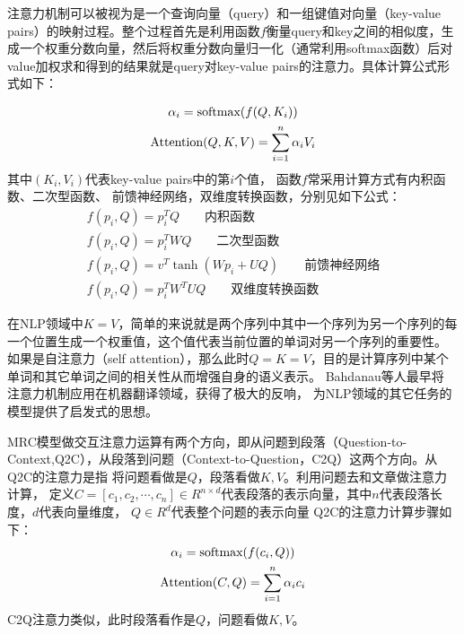 注意力机制可以被视为是一个查询向量（query）和一组键值对向量（key-value pairs）的映射过程。整个过程首先是利用函数$f$衡量query和key之间的相似度，生成一个权重分数向量，然后将权重分数向量归一化（通常利用softmax函数）后对value加权求和得到的结果就是query对key-value pairs的注意力。具体计算公式形式如下：

\begin{gather}
\alpha_i=\text{softmax}(f(Q,K_i)) \notag \\
\text{Attention}(Q,K,V)=\sum_{i=1}^{n}\alpha_iV_i
\end{gather}
其中$(K_i,V_i)$代表key-value pairs中的第$i$个值，
函数$f$常采用计算方式有内积函数、二次型函数、
前馈神经网络，双维度转换函数，分别见如下公式：
\begin{gather}
f(p_i,Q)=p_i^TQ \qquad \text{内积函数} \\
f(p_i,Q)=p_i^TWQ\qquad \text{二次型函数}\\
f(p_i,Q)=v^T\tanh(Wp_i+UQ)\qquad \text{前馈神经网络} \\
f(p_i,Q)=p_i^TW^TUQ \qquad \text{双维度转换函数}
\end{gather}

在NLP领域中$K=V$，简单的来说就是两个序列中其中一个序列为另一个序列的每一个位置生成一个权重值，这个值代表当前位置的单词对另一个序列的重要性。
如果是自注意力（self attention），那么此时$Q=K=V$，目的是计算序列中某个单词和其它单词之间的相关性从而增强自身的语义表示。
Bahdanau等人最早将
注意力机制应用在机器翻译领域，获得了极大的反响，
为NLP领域的其它任务的模型提供了启发式的思想。

MRC模型做交互注意力运算有两个方向，即从问题到段落（Question-to-Context,Q2C），从段落到问题（Context-to-Question，C2Q）这两个方向。从Q2C的注意力是指
将问题看做是$Q$，段落看做$K,V$。利用问题去和文章做注意力计算，
定义$C=[c_1,c_2,\cdots,c_n] \in R^{n\times d}$代表段落的表示向量，其中$n$代表段落长度，$d$代表向量维度，
$Q\in R^{d}$代表整个问题的表示向量
Q2C的注意力计算步骤如下：
\begin{gather}
\alpha_i=\text{softmax}(f(c_i,Q)) \notag \\
\text{Attention}(C,Q)=\sum_{i=1}^{n}\alpha_{i}c_i \notag 
\end{gather}
C2Q注意力类似，此时段落看作是$Q$，问题看做$K,V$。

